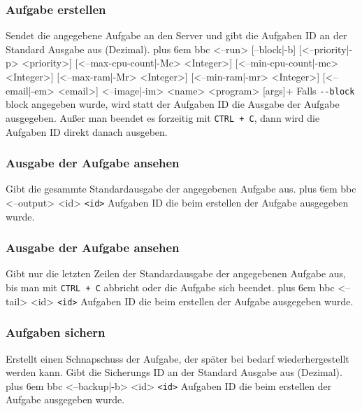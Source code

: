 \documentclass[a4paper,12pt]{article}
\makeatletter
\newenvironment{mycode}
 {\def\@xobeysp{\ }\verbatim\rightskip=0pt plus 6em\relax}
 {\endverbatim}
\makeatother
\begin{document}
\subsubsection{Aufgabe erstellen}
Sendet die angegebene Aufgabe an den Server und gibt die Aufgaben ID an der Standard Ausgabe aus (Dezimal).
\begin{mycode}
bbc <--run> [--block|-b] [<--priority|-p> <priority>] [<--max-cpu-count|-Mc> <Integer>] [<--min-cpu-count|-mc> <Integer>] [<--max-ram|-Mr> <Integer>] [<--min-ram|-mr> <Integer>] [<--email|-em> <email>] <--image|-im> <name> <program> [args]+
\end{mycode}
Falls \texttt{-{}-block} block angegeben wurde, wird statt der Aufgaben ID die Ausgabe der Aufgabe ausgegeben.
Außer man beendet es forzeitig mit \texttt{CTRL + C}, dann wird die Aufgaben ID direkt danach ausgeben.

\subsubsection{Ausgabe der Aufgabe ansehen}
Gibt die gesammte Standardausgabe der angegebenen Aufgabe aus.
\begin{mycode}
bbc <--output> <id>
\end{mycode}
\texttt{<id>} Aufgaben ID die beim erstellen der Aufgabe ausgegeben wurde.

\subsubsection{Ausgabe der Aufgabe ansehen}
Gibt nur die letzten Zeilen der Standardausgabe der angegebenen Aufgabe aus, bis man mit \texttt{CTRL + C} abbricht oder die Aufgabe sich beendet.
\begin{mycode}
bbc <--tail> <id>
\end{mycode}
\texttt{<id>} Aufgaben ID die beim erstellen der Aufgabe ausgegeben wurde.

\subsubsection{Aufgaben sichern}
Erstellt einen Schnapschuss der Aufgabe, der später bei bedarf wiederhergestellt werden kann.
Gibt die Sicherungs ID an der Standard Ausgabe aus (Dezimal).
\begin{mycode}
bbc <--backup|-b> <id>
\end{mycode}
\texttt{<id>} Aufgaben ID die beim erstellen der Aufgabe ausgegeben wurde.
\end{document}

